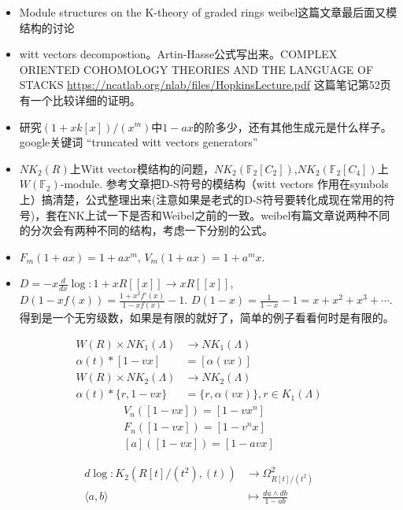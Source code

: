 \begin{itemize}
	\item Module structures on the K-theory of graded rings weibel这篇文章最后面又模结构的讨论
	\item witt vectors decompostion。Artin-Hasse公式写出来。COMPLEX ORIENTED COHOMOLOGY THEORIES AND THE LANGUAGE OF STACKS \url{https://ncatlab.org/nlab/files/HopkinsLecture.pdf}  这篇笔记第52页有一个比较详细的证明。
	\item 研究$(1+xk[x])/(x^m)$中$1-ax$的阶多少，还有其他生成元是什么样子。google关键词 “truncated witt vectors generators”
	\item $NK_2(R)$上Witt vector模结构的问题，$NK_2(\mathbb{F}_2[C_2])$,$NK_2(\mathbb{F}_2[C_4])$上$W(\mathbb{F}_2)$-module. 参考文章把D-S符号的模结构（witt vectors 作用在symbols上）搞清楚，公式整理出来(注意如果是老式的D-S符号要转化成现在常用的符号)，套在NK上试一下是否和Weibel之前的一致。weibel有篇文章说两种不同的分次会有两种不同的结构，考虑一下分别的公式。
	\item $F_m(1+ax)=1+ax^m$, $V_m(1+ax)=1+a^mx$.
	\item $D=-x \frac{d}{dx}\log \colon 1+xR[[x]]\longrightarrow xR[[x]]$,
$D(1-xf(x))=\frac{1+x^2f'(x)}{1-xf(x)}-1$. $D(1-x)=\frac{1}{1-x}-1=x+x^2+x^3+\cdots$. 得到是一个无穷级数，如果是有限的就好了，简单的例子看看何时是有限的。
\end{itemize}

\begin{align*}
W(R) \times NK_1(\Lambda) & \longrightarrow NK_1(\Lambda) \\
\alpha(t) *[1-vx] &=[\alpha(vx)]\\
W(R) \times NK_2(\Lambda) & \longrightarrow NK_2(\Lambda) \\
\alpha(t) *\{r,1-vx\} &=\{r,\alpha(vx)\}, r\in K_1(\Lambda)
\end{align*}
\begin{gather*}
V_n([1-vx])=[1-vx^n]\\
F_n([1-vx])=[1-v^nx]\\
[a]([1-vx])=[1-avx]
\end{gather*}

\begin{align*}
d\log \colon K_2(R[t]/(t^2),(t)) & \longrightarrow \Omega^2_{R[t]/(t^2)}\\
\langle a,b \rangle &\mapsto \frac{da\wedge db}{1-ab}
\end{align*}

